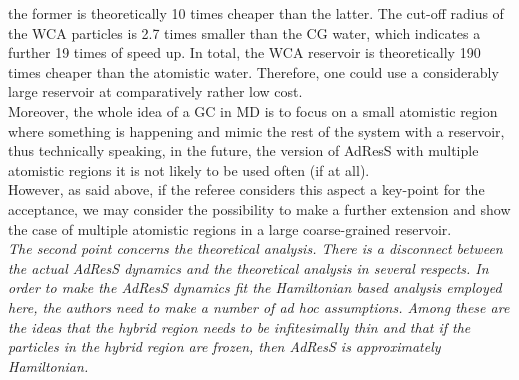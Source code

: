\documentclass[12pt,a4paper]{article}
\begin{document}
  the former is theoretically 10 times cheaper than the latter. The cut-off radius of the WCA particles is 2.7 times smaller than
  the CG water, which indicates a further 19 times of speed up. In total, the WCA reservoir is theoretically
  190 times cheaper than the atomistic
  water. Therefore, one could use a considerably large reservoir at comparatively rather low cost.\\
Moreover, the whole idea of a GC in MD is to focus on a small atomistic region where something is happening and mimic the rest of the system with a reservoir, thus technically speaking, in the future, the version of AdResS with multiple  atomistic regions it is not likely to be used often (if at all).\\
However, as said above, if the referee considers this aspect a key-point for the acceptance, we may consider the possibility to make a further extension and show the case of multiple atomistic regions in a large coarse-grained reservoir.
\\

{\color{teal} {\it The second point concerns the theoretical analysis. There is a disconnect between the actual AdResS
dynamics and the theoretical analysis in several respects. In order to make the AdResS dynamics fit the
Hamiltonian based analysis employed here, the authors need to make a number of ad hoc assumptions.
Among these are the ideas that the hybrid region needs to be infitesimally thin and that if the particles
in the hybrid region are frozen, then AdResS is approximately Hamiltonian.}}\\
\end{document}
